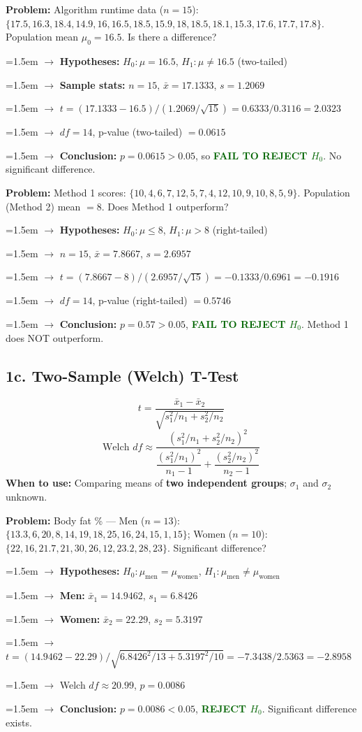 \documentclass[11pt, letterpaper]{article}
\newcommand{\ans}[1]{\textbf{\textcolor{darkgreen}{#1}}}
\newcommand{\step}[1]{\par\hangindent=1.5em\hangafter=1 $\rightarrow$ #1}
\begin{document}
\begin{examplebox}
\textbf{Problem:} Algorithm runtime data ($n=15$): $\{17.5, 16.3, 18.4, 14.9, 16, 16.5, 18.5, 15.9, 18, 18.5, 18.1, 15.3, 17.6, 17.7, 17.8\}$. Population mean $\mu_0 = 16.5$. Is there a difference?

\step{\textbf{Hypotheses:} $H_0: \mu = 16.5$, \quad $H_1: \mu \neq 16.5$ (two-tailed)}
\step{\textbf{Sample stats:} $n = 15$, $\bar{x} = 17.1333$, $s = 1.2069$}
\step{$t = (17.1333 - 16.5) / (1.2069/\sqrt{15}) = 0.6333 / 0.3116 = \mathbf{2.0323}$}
\step{$df = 14$, p-value (two-tailed) $= 0.0615$}
\step{\textbf{Conclusion:} $p = 0.0615 > 0.05$, so \ans{FAIL TO REJECT $H_0$}. No significant difference.}
\end{examplebox}

\begin{examplebox}
\textbf{Problem:} Method 1 scores: $\{10,4,6,7,12,5,7,4,12,10,9,10,8,5,9\}$. Population (Method 2) mean $= 8$. Does Method 1 outperform?

\step{\textbf{Hypotheses:} $H_0: \mu \leq 8$, \quad $H_1: \mu > 8$ (right-tailed)}
\step{$n = 15$, $\bar{x} = 7.8667$, $s = 2.6957$}
\step{$t = (7.8667 - 8) / (2.6957/\sqrt{15}) = -0.1333/0.6961 = \mathbf{-0.1916}$}
\step{$df = 14$, p-value (right-tailed) $= 0.5746$}
\step{\textbf{Conclusion:} $p = 0.57 > 0.05$, \ans{FAIL TO REJECT $H_0$}. Method 1 does NOT outperform.}
\end{examplebox}

\subsection{1c. Two-Sample (Welch) T-Test}

\begin{formulabox}
\[ t = \frac{\bar{x}_1 - \bar{x}_2}{\sqrt{s_1^2/n_1 + s_2^2/n_2}} \]
\[ \text{Welch } df \approx \frac{(s_1^2/n_1 + s_2^2/n_2)^2}{\dfrac{(s_1^2/n_1)^2}{n_1-1} + \dfrac{(s_2^2/n_2)^2}{n_2-1}} \]
\textbf{When to use:} Comparing means of \textbf{two independent groups}; $\sigma_1$ and $\sigma_2$ unknown.
\end{formulabox}

\begin{examplebox}
\textbf{Problem:} Body fat \% --- Men ($n=13$): $\{13.3,6,20,8,14,19,18,25,16,24,15,1,15\}$; Women ($n=10$): $\{22,16,21.7,21,30,26,12,23.2,28,23\}$. Significant difference?

\step{\textbf{Hypotheses:} $H_0: \mu_{\text{men}} = \mu_{\text{women}}$, \quad $H_1: \mu_{\text{men}} \neq \mu_{\text{women}}$}
\step{\textbf{Men:} $\bar{x}_1 = 14.9462$, $s_1 = 6.8426$}
\step{\textbf{Women:} $\bar{x}_2 = 22.29$, $s_2 = 5.3197$}
\step{$t = (14.9462 - 22.29) / \sqrt{6.8426^2/13 + 5.3197^2/10} = -7.3438 / 2.5363 = \mathbf{-2.8958}$}
\step{Welch $df \approx 20.99$, $p = 0.0086$}
\step{\textbf{Conclusion:} $p = 0.0086 < 0.05$, \ans{REJECT $H_0$}. Significant difference exists.}
\end{examplebox}
\end{document}
